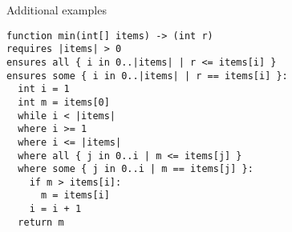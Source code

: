 \begin{frame}[fragile]{Additional examples}

\begin{verbatim}
function min(int[] items) -> (int r)
requires |items| > 0
ensures all { i in 0..|items| | r <= items[i] }
ensures some { i in 0..|items| | r == items[i] }:
  int i = 1
  int m = items[0]
  while i < |items|
  where i >= 1
  where i <= |items|
  where all { j in 0..i | m <= items[j] }
  where some { j in 0..i | m == items[j] }:
    if m > items[i]:
      m = items[i]
    i = i + 1
  return m
\end{verbatim}


\end{frame}


